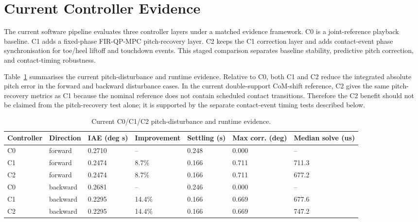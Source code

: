 %

\section{Current Controller Evidence}
\label{sec:current_controller_evidence}

The current software pipeline evaluates three controller layers under a
matched evidence framework. C0 is a joint-reference playback baseline. C1 adds
a fixed-phase FIR-QP-MPC pitch-recovery layer. C2 keeps the C1 correction layer
and adds contact-event phase synchronisation for toe/heel liftoff and touchdown
events. This staged comparison separates baseline stability, predictive pitch
correction, and contact-timing robustness.

Table~\ref{tab:c0_c1_c2_current_evidence_20260708} summarises the current
pitch-disturbance and runtime evidence. Relative to C0, both C1 and C2 reduce
the integrated absolute pitch error in the forward and backward disturbance
cases. In the current double-support CoM-shift reference, C2 gives the same
pitch-recovery metrics as C1 because the nominal reference does not contain
scheduled contact transitions. Therefore the C2 benefit should not be claimed
from the pitch-recovery test alone; it is supported by the separate
contact-event timing tests described below.

\begin{table}[htbp]
\centering
\caption{Current C0/C1/C2 pitch-disturbance and runtime evidence.}
\label{tab:c0_c1_c2_current_evidence_20260708}
\begin{tabular}{@{}lllllll@{}}
\toprule
Controller & Direction & IAE (deg s) & Improvement & Settling (s) & Max corr. (deg) & Median solve (us) \\
\midrule
C0 & forward & 0.2710 & -- & 0.248 & 0.000 & -- \\
C1 & forward & 0.2474 & 8.7\% & 0.166 & 0.711 & 711.3 \\
C2 & forward & 0.2474 & 8.7\% & 0.166 & 0.711 & 677.2 \\
C0 & backward & 0.2681 & -- & 0.246 & 0.000 & -- \\
C1 & backward & 0.2295 & 14.4\% & 0.166 & 0.669 & 677.6 \\
C2 & backward & 0.2295 & 14.4\% & 0.166 & 0.669 & 747.2 \\
\bottomrule
\end{tabular}
\end{table}

